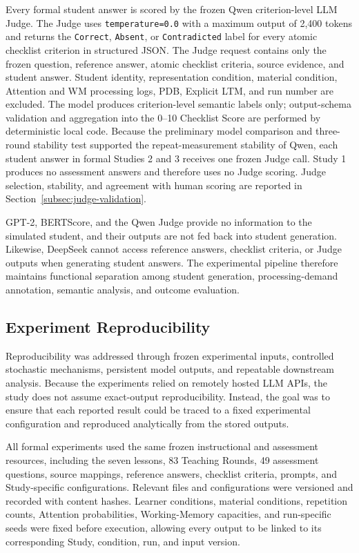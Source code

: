 Every formal student answer is scored by the frozen Qwen criterion-level LLM Judge. The Judge uses \texttt{temperature=0.0} with a maximum output of 2,400 tokens and returns the \texttt{Correct}, \texttt{Absent}, or \texttt{Contradicted} label for every atomic checklist criterion in structured JSON. The Judge request contains only the frozen question, reference answer, atomic checklist criteria, source evidence, and student answer. Student identity, representation condition, material condition, Attention and WM processing logs, PDB, Explicit LTM, and run number are excluded. The model produces criterion-level semantic labels only; output-schema validation and aggregation into the 0--10 Checklist Score are performed by deterministic local code. Because the preliminary model comparison and three-round stability test supported the repeat-measurement stability of Qwen, each student answer in formal Studies 2 and 3 receives one frozen Judge call. Study 1 produces no assessment answers and therefore uses no Judge scoring. Judge selection, stability, and agreement with human scoring are reported in Section~\ref{subsec:judge-validation}.

GPT-2, BERTScore, and the Qwen Judge provide no information to the simulated student, and their outputs are not fed back into student generation. Likewise, DeepSeek cannot access reference answers, checklist criteria, or Judge outputs when generating student answers. The experimental pipeline therefore maintains functional separation among student generation, processing-demand annotation, semantic analysis, and outcome evaluation.

\begingroup
{}
\subsection{Experiment Reproducibility}
\label{subsec:experiment-reproducibility}

Reproducibility was addressed through frozen experimental inputs, controlled stochastic mechanisms, persistent model outputs, and repeatable downstream analysis. Because the experiments relied on remotely hosted LLM APIs, the study does not assume exact-output reproducibility. Instead, the goal was to ensure that each reported result could be traced to a fixed experimental configuration and reproduced analytically from the stored outputs.

All formal experiments used the same frozen instructional and assessment resources, including the seven lessons, 83 Teaching Rounds, 49 assessment questions, source mappings, reference answers, checklist criteria, prompts, and Study-specific configurations. Relevant files and configurations were versioned and recorded with content hashes. Learner conditions, material conditions, repetition counts, Attention probabilities, Working-Memory capacities, and run-specific seeds were fixed before execution, allowing every output to be linked to its corresponding Study, condition, run, and input version.

